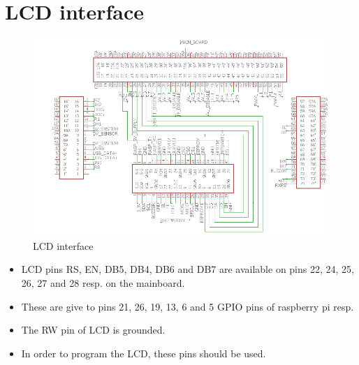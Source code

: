 \documentclass[a4paper,12pt,oneside]{book}
\begin{document}
\section{\textbf{LCD interface}}
\begin{figure}[h]
	\includegraphics[width=1\textwidth]{lcd}
	\caption{LCD interface}
\end{figure}
\hfill
\begin{itemize}
	\item {LCD pins RS, EN, DB5, DB4, DB6 and DB7 are available on pins 22, 24, 25, 26, 27 and 28 resp. on the mainboard.}
	\item {These are give to pins 21, 26, 19, 13, 6 and 5 GPIO pins of raspberry pi resp.}
	\item {The RW pin of LCD is grounded.}
	\item {In order to program the LCD, these pins should be used.}
\end{itemize}
\pagebreak
\end{document}
